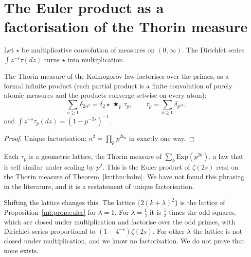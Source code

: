 \section{The Euler product as a factorisation of the Thorin measure}\label{mt:sec:euler}
Let $\star$ be multiplicative convolution of measures on $(0,\infty)$. The Dirichlet series $\int z^{-s}\tau(dz)$ turns $\star$ into multiplication.
\begin{proposition}\label{mt:prop:euler}
The Thorin measure of the Kolmogorov law factorises over the primes, as a formal infinite product (each partial product is a finite convolution of purely atomic measures and the products converge setwise on every atom):
\[
\sum_{n\ge1}\delta_{2n^2}=\delta_2\star\mathop{\bigstar}_p\tau_p,\qquad\tau_p=\sum_{k\ge0}\delta_{p^{2k}},
\]
and $\int z^{-s}\tau_p(dz)=(1-p^{-2s})^{-1}$.
\end{proposition}
\begin{proof}
Unique factorisation: $n^2=\prod_pp^{2k_p}$ in exactly one way.
\end{proof}
Each $\tau_p$ is a geometric lattice, the Thorin measure of $\sum_k\mathrm{Exp}(p^{2k})$, a law that is self similar under scaling by $p^2$. This is the Euler product of $\zeta(2s)$ read on the Thorin measure of Theorem~\ref{kr:thm:kolm}. We have not found this phrasing in the literature, and it is a restatement of unique factorisation.%

Shifting the lattice changes this. The lattice $\{2(k+\lambda)^2\}$ is the lattice of Proposition~\ref{mt:prop:euler} for $\lambda=1$. For $\lambda=\frac12$ it is $\frac12$ times the odd squares, which are closed under multiplication and factorise over the odd primes, with Dirichlet series proportional to $(1-4^{-s})\zeta(2s)$. For other $\lambda$ the lattice is not closed under multiplication, and we know no factorisation. We do not prove that none exists.

